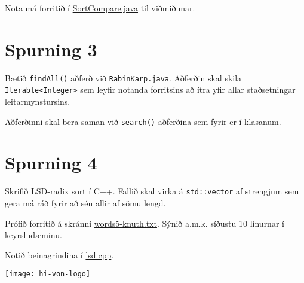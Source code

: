\documentclass{article}
\begin{document}
Nota má forritið í \href{https://github.com/Ernir/kennsluefni/tree/master/T2/Code/w7/SortCompare.java}{SortCompare.java} til viðmiðunar.

\section{Spurning 3}
Bætið \texttt{findAll()} aðferð við \texttt{RabinKarp.java}. Aðferðin skal skila \texttt{Iterable<Integer>} sem leyfir notanda forritsins að ítra yfir allar staðsetningar leitarmynstursins.

Aðferðinni skal bera saman við \texttt{search()} aðferðina sem fyrir er í klasanum.

\section{Spurning 4}
Skrifið LSD-radix sort í C++. Fallið skal virka á \texttt{std::vector} af strengjum sem gera má ráð fyrir að séu allir af sömu lengd.

Prófið forritið á skránni \href{http://introcs.cs.princeton.edu/java/data/words5-knuth.txt}{words5-knuth.txt}. Sýnið a.m.k. síðustu 10 línurnar í keyrsludæminu.

Notið beinagrindina í \href{https://github.com/Ernir/kennsluefni/tree/master/T2/Code/w12/lsd.cpp}{lsd.cpp}.

\vfill
\texttt{[image: hi-von-logo]}
\end{document}
